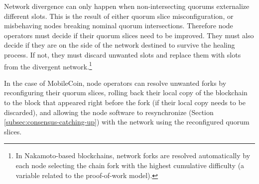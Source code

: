 Network divergence can only happen when non-intersecting quorums externalize different slots. This is the result of either quorum slice misconfiguration, or misbehaving nodes breaking nominal quorum intersections. Therefore node operators must decide if their quorum slices need to be improved. They must also decide if they are on the side of the network destined to survive the healing process. If not, they must discard unwanted slots and replace them with slots from the divergent network.\footnote{In Nakamoto-based blockchains, network forks are resolved automatically by each node selecting the chain fork with the highest cumulative difficulty (a variable related to the proof-of-work model).}

In the case of MobileCoin, node operators can resolve unwanted forks by reconfiguring their quorum slices, rolling back their local copy of the blockchain to the block that appeared right before the fork (if their local copy needs to be discarded), and allowing the node software to resynchronize (Section \ref{subsec:consensus-catching-up}) with the network using the reconfigured quorum slices.


